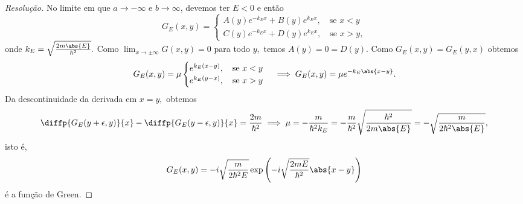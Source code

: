 \begin{proof}[Resolução]
   No limite em que \(a \to -\infty\) e \(b \to \infty\), devemos ter \(E < 0\) e então
   \begin{equation*}
       G_E(x, y) = \begin{cases}
          A(y) e^{-k_E x} + B(y) e^{k_E x}, \quad\text{se }x < y\\
          C(y) e^{-k_E x} + D(y) e^{k_E x}, \quad\text{se }x > y,
       \end{cases}
   \end{equation*}
   onde \(k_E = \sqrt{\frac{2m \abs{E}}{\hbar^2}}.\) Como \(\lim_{x \to \pm\infty} G(x,y) = 0\) para todo \(y,\) temos \(A(y) = 0 = D(y).\) Como \(G_E(x,y) = G_E(y,x)\) obtemos
   \begin{equation*}
       G_E(x,y) = \mu\begin{cases}
          e^{k_E(x - y)}, \quad\text{se }x < y\\
          e^{k_E(y - x)}, \quad\text{se }x > y
       \end{cases} \implies G_E(x,y) = \mu e^{-k_E \abs{x - y}}.
   \end{equation*}
   Da descontinuidade da derivada em \(x = y,\) obtemos
   \begin{equation*}
      \diffp{G_E(y + \epsilon, y)}{x} - \diffp{G_E(y-\epsilon, y)}{x} = \frac{2m}{\hbar^2} \implies \mu = -\frac{m}{\hbar^2k_E} = -\frac{m}{\hbar^2} \sqrt{\frac{\hbar^2}{2m \abs{E}}} = - \sqrt{\frac{m}{2\hbar^2 \abs{E}}},
   \end{equation*}
   isto é,
   \begin{equation*}
      G_E(x,y) = - i\sqrt{\frac{m}{2\hbar^2 E}} \exp\left(-i\sqrt{\frac{2m E}{\hbar^2}} \abs{x - y}\right)
   \end{equation*}
   é a função de Green.
\end{proof}
